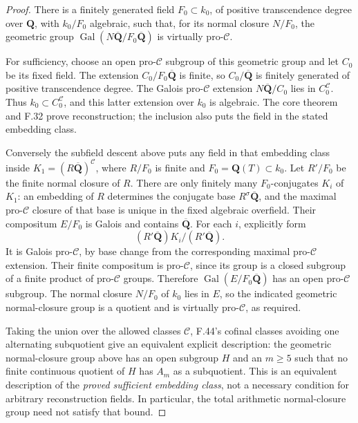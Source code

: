 \begin{proof}
There is a finitely generated field \(F_0\subset k_0\), of positive
transcendence degree over \(\mathbf Q\), with \(k_0/F_0\) algebraic,
such that, for its normal closure \(N/F_0\), the geometric group
\(\operatorname{Gal}(N\overline{\mathbf Q}/F_0\overline{\mathbf Q})\)
is virtually pro-\(\mathcal C\).

For sufficiency, choose an open pro-\(\mathcal C\) subgroup of this
geometric group and let \(C_0\) be its fixed field. The extension
\(C_0/F_0\overline{\mathbf Q}\) is finite, so
\(C_0/\overline{\mathbf Q}\) is finitely generated of positive
transcendence degree. The Galois pro-\(\mathcal C\) extension
\(N\overline{\mathbf Q}/C_0\) lies in \(C_0^{\mathcal C}\).
Thus \(k_0\subset C_0^{\mathcal C}\), and this latter extension over
\(k_0\) is algebraic. The core theorem and F.32 prove reconstruction;
the inclusion also puts the field in the stated embedding class.

Conversely the subfield descent above puts any field in that embedding class inside
\(K_1=(R\overline{\mathbf Q})^{\mathcal C}\), where \(R/F_0\) is
finite and \(F_0=\mathbf Q(T)\subset k_0\). Let \(R'/F_0\) be the
finite normal closure of \(R\). There are only finitely many
\(F_0\)-conjugates \(K_i\) of \(K_1\): an embedding of \(R\)
determines the conjugate base \(R^\sigma\overline{\mathbf Q}\), and
the maximal pro-\(\mathcal C\) closure of that base is unique in the
fixed algebraic overfield. Their compositum \(E/F_0\) is Galois and
contains \(\overline{\mathbf Q}\). For each \(i\), explicitly form
\[
         (R'\overline{\mathbf Q})K_i/(R'\overline{\mathbf Q}).
\]
It is Galois pro-\(\mathcal C\), by base change from the corresponding
maximal pro-\(\mathcal C\) extension. Their finite compositum is
pro-\(\mathcal C\), since its group is a closed subgroup of a finite
product of pro-\(\mathcal C\) groups. Therefore
\(\operatorname{Gal}(E/F_0\overline{\mathbf Q})\) has an open
pro-\(\mathcal C\) subgroup. The normal closure \(N/F_0\) of
\(k_0\) lies in \(E\), so the indicated geometric normal-closure
group is a quotient and is virtually pro-\(\mathcal C\), as required.

Taking the union over the allowed classes \(\mathcal C\), F.44's
cofinal classes avoiding one alternating subquotient give an equivalent
explicit description: the geometric normal-closure group above has an
open subgroup \(H\) and an \(m\ge5\) such that no finite continuous
quotient of \(H\) has \(A_m\) as a subquotient. This is an equivalent
description of the \emph{proved sufficient embedding class}, not a
necessary condition for arbitrary reconstruction fields. In particular,
the total arithmetic normal-closure group need not satisfy that bound.


\end{proof}
